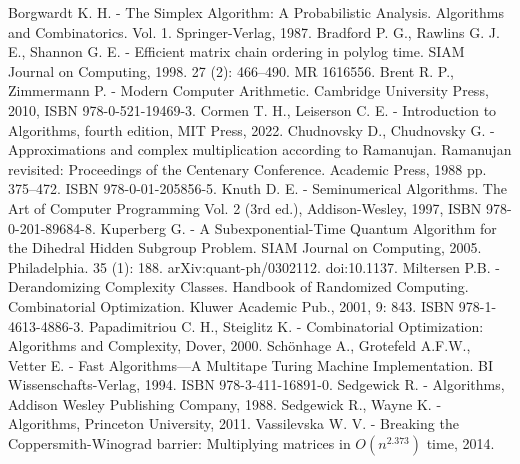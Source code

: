 \documentclass{article}
\begin{document}
\begin{thebibliography}{10}
	 Borgwardt K. H. - The Simplex Algorithm: A Probabilistic Analysis. Algorithms and Combinatorics. Vol. 1. Springer-Verlag, 1987.
	 Bradford P. G., Rawlins G. J. E., Shannon G. E. - Efficient matrix chain ordering in polylog time. SIAM Journal on Computing, 1998. 27 (2): 466–490. MR 1616556.
	 Brent R. P., Zimmermann P. - Modern Computer Arithmetic. Cambridge University Press, 2010, ISBN 978-0-521-19469-3.
	 Cormen T. H., Leiserson C. E. - Introduction to Algorithms, fourth edition, MIT Press, 2022.
	 Chudnovsky D., Chudnovsky G. - Approximations and complex multiplication according to Ramanujan. Ramanujan revisited: Proceedings of the Centenary Conference. Academic Press, 1988 pp. 375–472. ISBN 978-0-01-205856-5.
	 Knuth D. E. - Seminumerical Algorithms. The Art of Computer Programming Vol. 2 (3rd ed.), Addison-Wesley, 1997, ISBN 978-0-201-89684-8.
	 Kuperberg G. - A Subexponential-Time Quantum Algorithm for the Dihedral Hidden Subgroup Problem. SIAM Journal on Computing, 2005. Philadelphia. 35 (1): 188. arXiv:quant-ph/0302112. doi:10.1137.
	 Miltersen P.B.  - Derandomizing Complexity Classes. Handbook of Randomized Computing. Combinatorial Optimization. Kluwer Academic Pub., 2001,  9: 843. ISBN 978-1-4613-4886-3.
	Papadimitriou C. H., Steiglitz K. - Combinatorial Optimization: Algorithms and Complexity, Dover, 2000.
	 Schönhage A., Grotefeld A.F.W., Vetter E. - Fast Algorithms—A Multitape Turing Machine Implementation. BI Wissenschafts-Verlag, 1994. ISBN 978-3-411-16891-0.
	 Sedgewick R. - Algorithms, Addison Wesley Publishing Company, 1988.
	 Sedgewick R., Wayne K. - Algorithms, Princeton University, 2011.
	 Vassilevska W. V. - Breaking the Coppersmith-Winograd barrier: Multiplying matrices in $O(n^{2.373})$ time, 2014.
\end{thebibliography}

\end{document}

